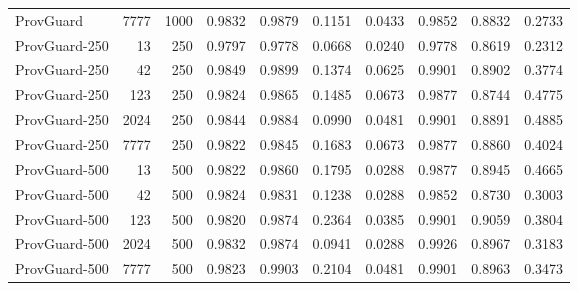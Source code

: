 \begin{tabular}{@{}lrrrrrrrrr@{}}
ProvGuard & 7777 & 1000 & 0.9832 & 0.9879 & 0.1151 & 0.0433 & 0.9852 & 0.8832 & 0.2733 \\
ProvGuard-250 & 13 & 250 & 0.9797 & 0.9778 & 0.0668 & 0.0240 & 0.9778 & 0.8619 & 0.2312 \\
ProvGuard-250 & 42 & 250 & 0.9849 & 0.9899 & 0.1374 & 0.0625 & 0.9901 & 0.8902 & 0.3774 \\
ProvGuard-250 & 123 & 250 & 0.9824 & 0.9865 & 0.1485 & 0.0673 & 0.9877 & 0.8744 & 0.4775 \\
ProvGuard-250 & 2024 & 250 & 0.9844 & 0.9884 & 0.0990 & 0.0481 & 0.9901 & 0.8891 & 0.4885 \\
ProvGuard-250 & 7777 & 250 & 0.9822 & 0.9845 & 0.1683 & 0.0673 & 0.9877 & 0.8860 & 0.4024 \\
ProvGuard-500 & 13 & 500 & 0.9822 & 0.9860 & 0.1795 & 0.0288 & 0.9877 & 0.8945 & 0.4665 \\
ProvGuard-500 & 42 & 500 & 0.9824 & 0.9831 & 0.1238 & 0.0288 & 0.9852 & 0.8730 & 0.3003 \\
ProvGuard-500 & 123 & 500 & 0.9820 & 0.9874 & 0.2364 & 0.0385 & 0.9901 & 0.9059 & 0.3804 \\
ProvGuard-500 & 2024 & 500 & 0.9832 & 0.9874 & 0.0941 & 0.0288 & 0.9926 & 0.8967 & 0.3183 \\
ProvGuard-500 & 7777 & 500 & 0.9823 & 0.9903 & 0.2104 & 0.0481 & 0.9901 & 0.8963 & 0.3473 \\
\bottomrule
\end{tabular}
